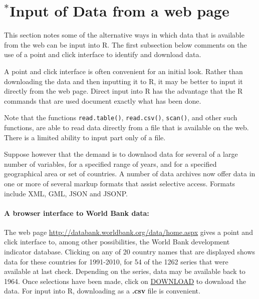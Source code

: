 \documentclass{tufte-book}\usepackage[]{graphicx}\usepackage[]{color}
\newcommand{\txtt}[1]{\texttt{#1}}
\begin{document}
\section{$^*$Input of  Data from a web page}

This section notes some of the alternative ways in which data that is
available from the web can be input into R.  The first subsection
below comments on the use of a point and click interface to identify
and download data.

A point and click interface is often convenient for an initial look.
Rather than downloading the data and then inputting it to R, it may be
better to input it directly from the web page.  Direct input into R
has the advantage that the R commands that are used document exactly
what has been done.

Note that the functions \txtt{read.table()}, \txtt{read.csv()},
\txtt{scan()}, and other such functions, are able to read data
directly from a file that is available on the web.  There is a
limited ability to input part only of a file.

Suppose however that the demand is to downlaod data for several of a
large number of variables, for a specified range of years, and for a
specified geographical area or set of countries.    A number of data
archives now offer data in one or more of several markup formats that
assist selective access. Formats include XML, GML, JSON and JSONP.

\paragraph{A browser interface to World Bank data:}
The web page
\url{http://databank.worldbank.org/data/home.aspx} gives a point and click
interface to, among other possibilities, the World Bank development
indicator database.  Clicking on any of 20 country names that are
displayed shows data for these countries for 1991-2010, for 54 of the
1262 series that were available at last check.  Depending on the
series, data may be available back to 1964.  Once selections have been
made, click on \underline{DOWNLOAD} to download the data.  For input
into R, downloading as a {\bf .csv} file is convenient.
\end{document}
